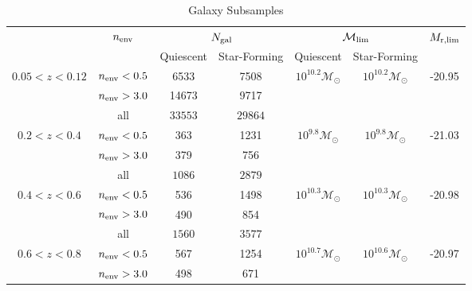 \documentclass{emulateapj}
\def \lowenvthresh {0.5}
\def \highenvthresh {3.0}
\begin{document}
\begin{table*} 
  \caption{Galaxy Subsamples}
  \label{tab:subsample}
  \begin{center}
    \leavevmode
    \begin{tabular}{ccccccc} \hline \hline              
     &\multicolumn{1}{c}{$n_{\rm{env}}$}        & \multicolumn{2}{c}{$N_{\rm{gal}}$}  & \multicolumn{2}{c}{$\mathcal{M}_{\rm{lim}}$} & $M_{\rm{r}, lim}$ \\ 
    & & Quiescent & Star-Forming & Quiescent & Star-Forming &  \\ \hline 
$0.05 < z < 0.12$ & $n_{\rm{env}} < \lowenvthresh $ & 6533 & 7508 & $10^{10.2} \mathcal{M}_{\odot}$ & $10^{10.2} \mathcal{M}_{\odot}$ & -20.95 \\
               & $n_{\rm{env}} > \highenvthresh $ &14673 & 9717 &                          \\ 
                              & all          &$33553$                       & $29864$                          \\ \hline
$0.2 < z < 0.4$      &$n_{\rm{env}} < \lowenvthresh $           &363                    &1231 & $10^{9.8} \mathcal{M}_{\odot}$ & $10^{9.8} \mathcal{M}_{\odot}$ &-21.03 \\
               &$n_{\rm{env}} > \highenvthresh $            &379                    &756                           \\
               & all                & $1086$                      & $2879$                          \\ \hline
$0.4 < z < 0.6$      &$n_{\rm{env}} < \lowenvthresh $           &536                       &1498 & $10^{10.3} \mathcal{M}_{\odot}$ & $10^{10.3} \mathcal{M}_{\odot}$ & -20.98 \\
               &$n_{\rm{env}} > \highenvthresh $            &490                       &854                           \\
               & all               & $1560$                      & $3577$                          \\ \hline
$0.6 < z < 0.8$      &$n_{\rm{env}} < \lowenvthresh $           &567                       &1254  & $10^{10.7} \mathcal{M}_{\odot}$ & $10^{10.6} \mathcal{M}_{\odot}$ & -20.97 \\
               &$n_{\rm{env}} > \highenvthresh $            &498                       &671                           \\

\end{tabular}
\end{center}
\end{table*}
\end{document}
